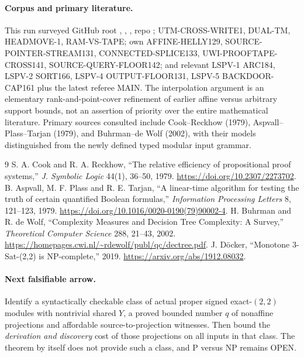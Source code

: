 \documentclass[11pt]{article}
\begin{document}
\paragraph{Corpus and primary literature.}
This run surveyed GitHub root , , , repo ; UTM-CROSS-WRITE1, DUAL-TM, HEADMOVE-1, RAM-VS-TAPE; own AFFINE-HELLY129, SOURCE-POINTER-STREAM131, CONNECTED-SPLICE133, UWI-PROOFTAPE-CROSS141, SOURCE-QUERY-FLOOR142; and relevant LSPV-1 ARC184, LSPV-2 SORT166, LSPV-4 OUTPUT-FLOOR131, LSPV-5 BACKDOOR-CAP161 plus the latest referee MAIN. The interpolation argument is an elementary rank-and-point-cover refinement of earlier affine versus arbitrary support bounds, not an assertion of priority over the entire mathematical literature. Primary sources consulted include Cook--Reckhow (1979), Aspvall--Plass--Tarjan (1979), and Buhrman--de Wolf (2002), with their models distinguished from the newly defined typed modular input grammar.
\begin{thebibliography}{9}
 S. A. Cook and R. A. Reckhow, ``The relative efficiency of propositional proof systems,'' \emph{J. Symbolic Logic} 44(1), 36--50, 1979. \url{https://doi.org/10.2307/2273702}.
 B. Aspvall, M. F. Plass and R. E. Tarjan, ``A linear-time algorithm for testing the truth of certain quantified Boolean formulas,'' \emph{Information Processing Letters} 8, 121--123, 1979. \url{https://doi.org/10.1016/0020-0190(79)90002-4}.
 H. Buhrman and R. de Wolf, ``Complexity Measures and Decision Tree Complexity: A Survey,'' \emph{Theoretical Computer Science} 288, 21--43, 2002. \url{https://homepages.cwi.nl/~rdewolf/publ/qc/dectree.pdf}.
 J. D\"ocker, ``Monotone 3-Sat-(2,2) is NP-complete,'' 2019. \url{https://arxiv.org/abs/1912.08032}.
\end{thebibliography}
\paragraph{Next falsifiable arrow.} Identify a syntactically checkable class of actual proper signed exact-$(2,2)$ modules with nontrivial shared $Y$, a proved bounded number $q$ of nonaffine projections and affordable source-to-projection witnesses. Then bound the \emph{derivation and discovery} cost of those projections on all inputs in that class. The theorem by itself does not provide such a class, and P versus NP remains OPEN.
\end{document}
